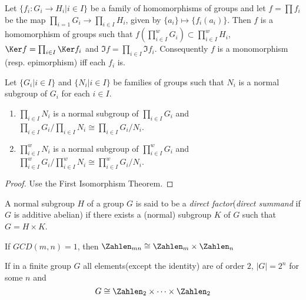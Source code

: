 \begin{Theorem}
	Let $ \{f_i:G_i \to H_i | i \in I \} $ be a family of homomorphisms of groups and let $ f=\prod f_i $ be the map $ \prod_{i=1} G_i \to \prod_{i \in I} H_i $, given by $ \{a_i \} \mapsto \{f_i(a_i) \}$. Then $ f $ is a homomorphism of groups such that $ f(\prod_{i \in I}^{w}G_i)\subset \prod_{i \in I}^{w}H_i $, $ \Ker f = \prod_{i \in I} \Ker f_i $ and $ \Im f = \prod_{i \in I}\Im f_i $. Consequently $ f $ is a monomorphism (resp. epimorphism) iff each $ f_i $ is.
\end{Theorem}
\begin{Corollary}
	Let $ \{G_i | i \in I \} $ and $ \{N_i | i\in I \} $ be families of groups such that $ N_i $ is a normal subgroup of $ G_i $ for each $ i \in I $.
	\begin{enumerate}
		\item $ \prod_{i \in I} N_i $ is a normal subgroup of $ \prod_{i \in I} G_i  $ and $ \prod_{i \in I} G_i/\prod_{i \in I} N_i  \cong \prod_{i \in I} G_i/N_i $.
		\item $ \prod_{i \in I}^w N_i $ is a normal subgroup of $ \prod_{i \in I}^w G_i  $ and $ \prod_{i \in I}^w G_i/\prod_{i \in I}^w N_i  \cong \prod_{i \in I}^w G_i/N_i $.
	\end{enumerate}
\end{Corollary}
\begin{proof}
	Use the First Isomorphism Theorem.
\end{proof}
\begin{Definition}
	A normal subgroup $ H $ of a group $ G $ is said to be a \textit{direct factor}(\textit{direct summand} if $ G $ is additive abelian) if there exists a (normal) subgroup $ K $ of $ G $ such that $ G = H \times K $.
\end{Definition}
\begin{Theorem}
	If $ GCD(m,n)=1 $, then $ \Zahlen_{mn}\cong \Zahlen_m \times \Zahlen_{n} $
\end{Theorem}
\begin{Theorem}
	If in a finite group $ G $ all elements(except the identity) are of order $ 2 $, $ |G|=2^n $ for some $ n $ and
	\begin{equation}
		G\cong \Zahlen_2 \times \cdots \times \Zahlen_2 \nonumber
	\end{equation}
\end{Theorem}





